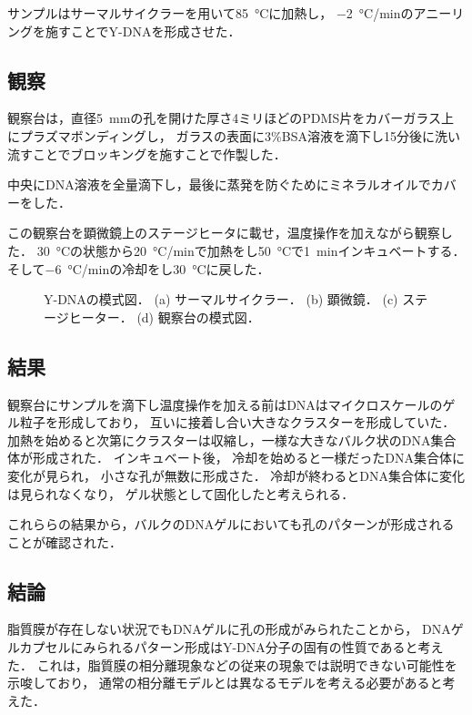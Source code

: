 サンプルはサーマルサイクラーを用いて\SI{85}{\celsius}に加熱し，
\SI{-2}{\celsius/min}のアニーリングを施すことでY-DNAを形成させた．

\subsection{観察}
観察台は，直径\SI{5}{mm}の孔を開けた厚さ4ミリほどのPDMS片をカバーガラス上にプラズマボンディングし，
ガラスの表面に3\%BSA溶液を滴下し15分後に洗い流すことでブロッキングを施すことで作製した．

中央にDNA溶液を全量滴下し，最後に蒸発を防ぐためにミネラルオイルでカバーをした．

この観察台を顕微鏡上のステージヒータに載せ，温度操作を加えながら観察した．
\SI{30}{\celsius}の状態から\SI{20}{\celsius/min}で加熱をし\SI{50}{\celsius}で\SI{1}{min}インキュベートする．
そして\SI{-6}{\celsius/min}の冷却をし\SI{30}{\celsius}に戻した．


\begin{figure}
\centering

\caption{Y-DNAの模式図．
    (a) サーマルサイクラー．
    (b) 顕微鏡．
    (c) ステージヒーター．
    (d) 観察台の模式図．
}

\label{fig:equipments}
\end{figure}


\subsection{結果}
観察台にサンプルを滴下し温度操作を加える前はDNAはマイクロスケールのゲル粒子を形成しており，
互いに接着し合い大きなクラスターを形成していた．%
加熱を始めると次第にクラスターは収縮し，一様な大きなバルク状のDNA集合体が形成された．
インキュベート後，
冷却を始めると一様だったDNA集合体に変化が見られ，
小さな孔が無数に形成さた．
冷却が終わるとDNA集合体に変化は見られなくなり，
ゲル状態として固化したと考えられる．

これららの結果から，バルクのDNAゲルにおいても孔のパターンが形成されることが確認された．

\subsection{結論}
脂質膜が存在しない状況でもDNAゲルに孔の形成がみられたことから，
DNAゲルカプセルにみられるパターン形成はY-DNA分子の固有の性質であると考えた．
これは，脂質膜の相分離現象などの従来の現象では説明できない可能性を示唆しており，
通常の相分離モデルとは異なるモデルを考える必要があると考えた．
